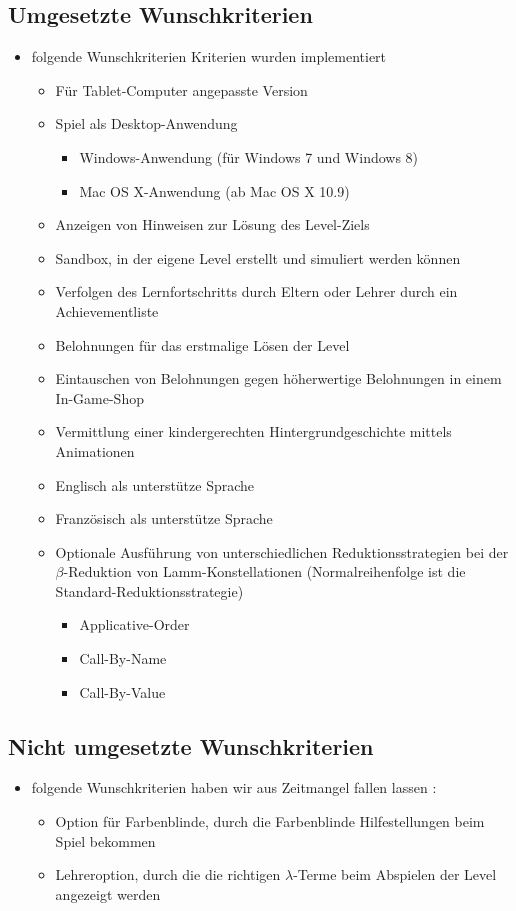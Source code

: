 \subsection{Umgesetzte Wunschkriterien}
\begin{itemize}
\item folgende Wunschkriterien Kriterien wurden implementiert 
\begin{itemize}
\item Für Tablet-Computer angepasste Version
	\item Spiel als Desktop-Anwendung
	\begin{itemize}
		\item Windows-Anwendung (für Windows 7 und Windows 8)
		\item Mac OS X-Anwendung (ab Mac OS X 10.9)
	\end{itemize}
	\item Anzeigen von Hinweisen zur Lösung des Level-Ziels
	\item Sandbox, in der eigene Level erstellt und simuliert werden können
	\item Verfolgen des Lernfortschritts durch Eltern oder Lehrer durch ein Achievementliste
	\item Belohnungen für das erstmalige Lösen der Level
	\item Eintauschen von Belohnungen gegen höherwertige Belohnungen in einem In-Game-Shop
	
	
	\item Vermittlung einer kindergerechten Hintergrundgeschichte mittels Animationen
	\item Englisch als unterstütze Sprache
	\item Französisch als unterstütze Sprache
	\item Optionale Ausführung von unterschiedlichen Reduktionsstrategien bei der $\beta$-Reduktion von Lamm-Konstellationen (Normalreihenfolge ist die Standard-Reduktionsstrategie)
	
	\begin{itemize}
		\item Applicative-Order
		\item Call-By-Name
		\item Call-By-Value
	\end{itemize}
	\end{itemize}
\end{itemize}


\subsection{Nicht umgesetzte Wunschkriterien}
\begin{itemize}
\item folgende Wunschkriterien haben wir aus Zeitmangel fallen lassen :
\begin{itemize}
\item Option für Farbenblinde, durch die Farbenblinde Hilfestellungen beim Spiel bekommen
\item Lehreroption, durch die die richtigen $\lambda$-Terme beim Abspielen der Level angezeigt werden
\end{itemize}
\end{itemize}
